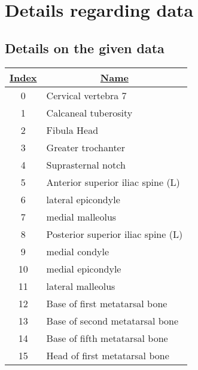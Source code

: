 \chapter{Details regarding data}

\section{Details on the given data}

\begin{table}[]
\begin{tabular}{|c|l|}
\hline
{\ul \textbf{Index}} & \multicolumn{1}{c|}{{\ul \textbf{Name}}} \\ \hline
0                    & Cervical vertebra 7                      \\ \hline
1                    & Calcaneal tuberosity                     \\ \hline
2                    & Fibula Head                              \\ \hline
3                    & Greater trochanter                       \\ \hline
4                    & Suprasternal notch                       \\ \hline
5                    & Anterior superior iliac spine (L)        \\ \hline
6                    & lateral epicondyle                       \\ \hline
7                    & medial malleolus                         \\ \hline
8                    & Posterior superior iliac spine (L)       \\ \hline
9                    & medial condyle                           \\ \hline
10                   & medial epicondyle                        \\ \hline
11                   & lateral malleolus                        \\ \hline
12                   & Base of first metatarsal bone            \\ \hline
13                   & Base of second metatarsal bone           \\ \hline
14                   & Base of fifth metatarsal bone            \\ \hline
15                   & Head of first metatarsal bone            \\ \hline

\end{tabular}
\end{table}
